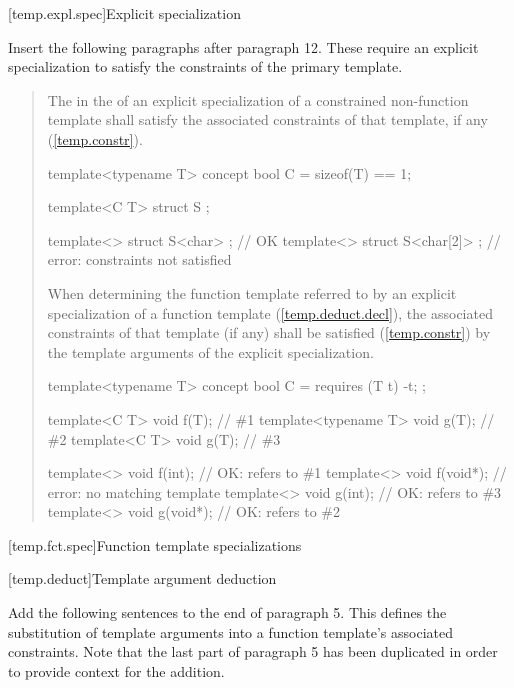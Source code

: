 [temp.expl.spec]{Explicit specialization}

Insert the following paragraphs after paragraph 12. These require
an explicit specialization to satisfy the constraints of the primary
template.

\begin{quote}
\begin{addedblock}
\setcounter{Paras}{12}
\pnum
The  in the
 of an explicit 
specialization of a constrained non-function template shall satisfy the 
associated constraints of that template, if any 
(\ref{temp.constr}).
% 
\enterexample
\begin{codeblock}
template<typename T> concept bool C = sizeof(T) == 1;

template<C T> struct S { };

template<> struct S<char> { };    // OK
template<> struct S<char[2]> { }; // error: constraints not satisfied
\end{codeblock}
\exitexample

\pnum
When determining the function template referred to by an explicit 
specialization of a function template (\ref{temp.deduct.decl}),
the associated constraints of that template (if any) shall be satisfied 
(\ref{temp.constr}) by the template arguments of the explicit specialization.

\enterexample
\begin{codeblock}
template<typename T> concept bool C = requires (T t) { -t; };

template<C T>        void f(T); // \#1
template<typename T> void g(T); // \#2
template<C T>        void g(T); // \#3

template<> void f(int);   // OK: refers to \#1
template<> void f(void*); // error: no matching template
template<> void g(int);   // OK: refers to \#3
template<> void g(void*); // OK: refers to \#2
\end{codeblock}
\exitexample
\end{addedblock}
\end{quote}


[temp.fct.spec]{Function template specializations}

[temp.deduct]{Template argument deduction}

Add the following sentences to the end of paragraph 5. This defines
the substitution of template arguments into a function template's
associated constraints. Note that the last part of paragraph 5
has been duplicated in order to provide context for the addition.

